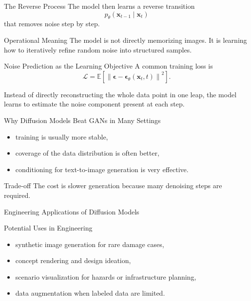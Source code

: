 \documentclass[12pt]{beamer}
\begin{document}
\begin{frame}{The Reverse Process}
  The model then learns a reverse transition
  \[
    p_{\theta}(\mathbf{x}_{t-1}\mid\mathbf{x}_t)
  \]
  that removes noise step by step.

  \begin{conceptbox}{Operational Meaning}
    The model is not directly memorizing images. It is learning how to iteratively refine random noise into structured samples.
  \end{conceptbox}
\end{frame}

\begin{frame}{Noise Prediction as the Learning Objective}
  A common training loss is
  \[
    \mathcal{L} =
    \mathbb{E}\left[\left\|\boldsymbol{\epsilon}-\boldsymbol{\epsilon}_{\theta}(\mathbf{x}_t,t)\right\|^2\right].
  \]

  Instead of directly reconstructing the whole data point in one leap, the model learns to estimate the noise component present at each step.
\end{frame}

\begin{frame}{Why Diffusion Models Beat GANs in Many Settings}
  \begin{itemize}
    \item training is usually more stable,
    \item coverage of the data distribution is often better,
    \item conditioning for text-to-image generation is very effective.
  \end{itemize}

  \begin{warningbox}{Trade-off}
    The cost is slower generation because many denoising steps are required.
  \end{warningbox}
\end{frame}

\begin{frame}{Engineering Applications of Diffusion Models}
  \begin{examplebox}{Potential Uses in Engineering}
    \begin{itemize}
      \item synthetic image generation for rare damage cases,
      \item concept rendering and design ideation,
      \item scenario visualization for hazards or infrastructure planning,
      \item data augmentation when labeled data are limited.
    \end{itemize}
  \end{examplebox}
\end{frame}
\end{document}
